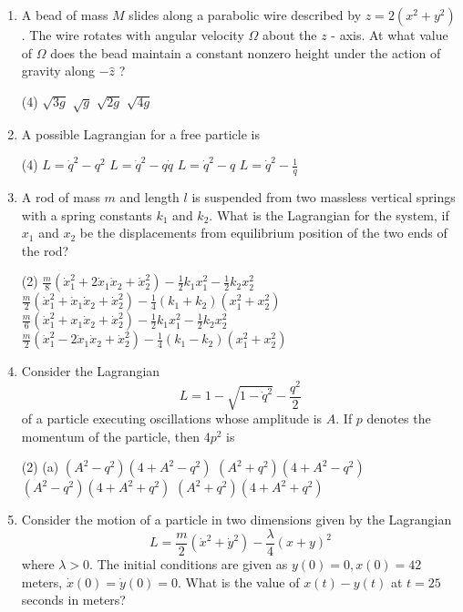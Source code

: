 \begin{enumerate}
\begin{tasks}
	\end{tasks}
	\item A bead of mass $M$ slides along a parabolic wire described by $z=2\left(x^{2}+y^{2}\right)$. The wire rotates with angular velocity $\Omega$ about the $z$ - axis. At what value of $\Omega$ does the bead maintain a constant nonzero height under the action of gravity along $-\hat{z}$ ?
	{}
	\begin{tasks}(4)
		\task[\textbf{A.}] $\sqrt{3 g}$
		\task[\textbf{B.}] $\sqrt{g}$
		\task[\textbf{C.}] $\sqrt{2 g}$
		\task[\textbf{D.}] $\sqrt{4 g}$
	\end{tasks}
	\item A possible Lagrangian for a free particle is
	{}
	\begin{tasks}(4)
		\task[\textbf{A.}] $L=\dot{q}^{2}-q^{2}$
		\task[\textbf{B.}] $L=\dot{q}^{2}-q \dot{q}$
		\task[\textbf{C.}] $L=\dot{q}^{2}-q$
		\task[\textbf{D.}] $L=\dot{q}^{2}-\frac{1}{q}$
	\end{tasks}
	\item  A rod of mass $m$ and length $l$ is suspended from two massless vertical springs with a spring constants $k_{1}$ and $k_{2} .$ What is the Lagrangian for the system, if $x_{1}$ and $x_{2}$ be the displacements from equilibrium position of the two ends of the rod?
	{}
	\begin{tasks}(2)
		\task[\textbf{A.}] $\frac{m}{8}\left(\dot{x}_{1}^{2}+2 \dot{x}_{1} \dot{x}_{2}+\dot{x}_{2}^{2}\right)-\frac{1}{2} k_{1} x_{1}^{2}-\frac{1}{2} k_{2} x_{2}^{2}$
		\task[\textbf{B.}] $\frac{m}{2}\left(\dot{x}_{1}^{2}+\dot{x}_{1} \dot{x}_{2}+\dot{x}_{2}^{2}\right)-\frac{1}{4}\left(k_{1}+k_{2}\right)\left(x_{1}^{2}+x_{2}^{2}\right)$
		\task[\textbf{C.}] $\frac{m}{6}\left(\dot{x}_{1}^{2}+x_{1} \dot{x}_{2}+\dot{x}_{2}^{2}\right)-\frac{1}{2} k_{1} x_{1}^{2}-\frac{1}{2} k_{2} x_{2}^{2}$
		\task[\textbf{D.}] $\frac{m}{2}\left(\dot{x}_{1}^{2}-2 \dot{x}_{1} \dot{x}_{2}+\dot{x}_{2}^{2}\right)-\frac{1}{4}\left(k_{1}-k_{2}\right)\left(x_{1}^{2}+x_{2}^{2}\right)$
	\end{tasks}
	\item Consider the Lagrangian
	$$L=1-\sqrt{1-\dot{q}^{2}}-\frac{q^{2}}{2}$$
	of a particle executing oscillations whose amplitude is $A$. If $p$ denotes the momentum of the particle, then $4 p^{2}$ is
	{}
	\begin{tasks}(2)
		\task[\textbf{A.}] (a) $\left(A^{2}-q^{2}\right)\left(4+A^{2}-q^{2}\right)$
		\task[\textbf{B.}] $\left(A^{2}+q^{2}\right)\left(4+A^{2}-q^{2}\right)$
		\task[\textbf{C.}] $\left(A^{2}-q^{2}\right)\left(4+A^{2}+q^{2}\right)$
		\task[\textbf{D.}] $\left(A^{2}+q^{2}\right)\left(4+A^{2}+q^{2}\right)$
	\end{tasks}	
	\item Consider the motion of a particle in two dimensions given by the Lagrangian $$L=\frac{m}{2}\left(\dot{x}^{2}+\dot{y}^{2}\right)-\frac{\lambda}{4}(x+y)^{2}$$
	where $\lambda>0$. The initial conditions are given as $y(0)=0, x(0)=42$ meters, $\dot{x}(0)=\dot{y}(0)=0$. What is the value of $x(t)-y(t)$ at $t=25$ seconds in meters?
	{}
\end{enumerate}
